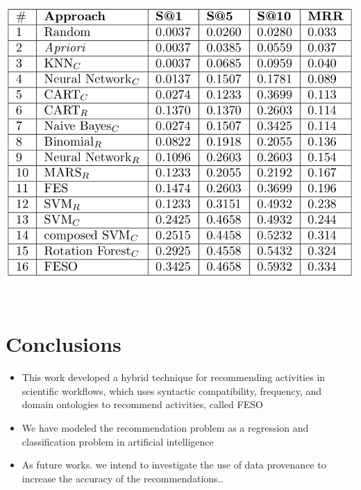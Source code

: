 \documentclass[40pt, a0, portrait]{a0poster}
\begin{document}
\begin{multicols}{2}
\begin{center}\vspace{1cm}
\includegraphics[height=12cm, width=28cm]{resultados.png}
\end{center}\vspace{1cm}


\color{SaddleBrown} %

\section*{Conclusions}

\begin{itemize}
\item This work developed a hybrid technique for recommending activities in scientific workflows, which uses syntactic compatibility, frequency, and domain ontologies to recommend activities, called FESO
\item We have modeled the recommendation problem as a regression and classification problem in artificial intelligence
\item As future works. we intend to investigate the use of data provenance to increase the accuracy of the recommendations..
\end{itemize}


\end{multicols}
\end{document}
